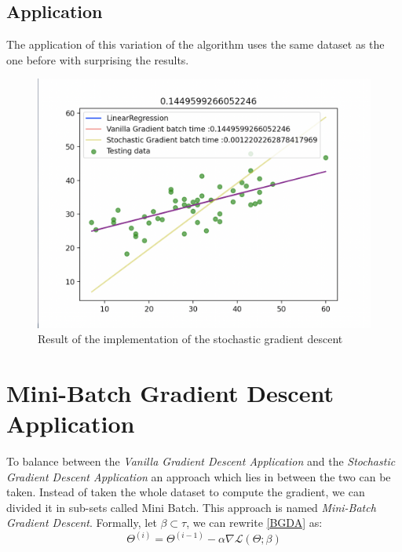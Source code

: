 \documentclass[conference]{IEEEtran}
\begin{document}
\subsection{Application}
The application of this variation of the algorithm uses the same dataset as the one before with surprising the results. 


\begin{figure}[ht]
    \includegraphics[scale=0.35]{Schermata 2021-05-01 alle 18.53.24.png}
    \caption{Result of the implementation of the stochastic gradient descent}
    \label{fig:va_gr_ben_eta_big}
\end{figure}





\section{Mini-Batch Gradient Descent Application}


To balance between the \textit{Vanilla Gradient Descent Application} and the  \textit{Stochastic Gradient Descent Application} an approach which lies in between the two can be taken. Instead of taken the whole dataset to compute the gradient, we can divided it in sub-sets called Mini Batch. This approach is named \textit{Mini-Batch Gradient Descent}. 
Formally, let $\beta \subset \tau$, we can rewrite \eqref{BGDA} as:
\begin{equation}
    \Theta^{(i)} = \Theta^{(i-1)} - \alpha\nabla\mathscr{L}(\Theta;\beta )\label{eq:MBGDA}
\end{equation}
\end{document}
